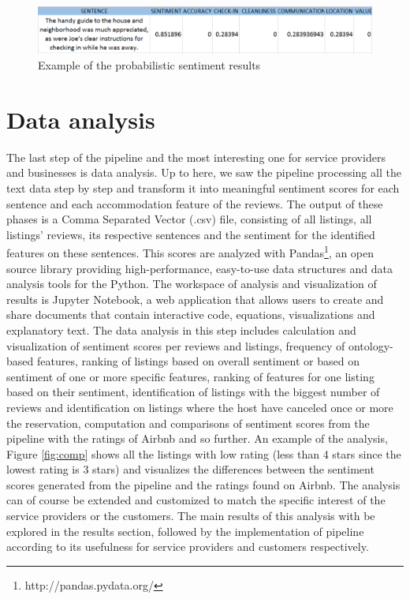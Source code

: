 \begin{figure}[h!]
	\centering
	\includegraphics[height=0.1\textheight]{example_pip}
	\caption{Example of the probabilistic sentiment results}
	\label{fig:sent}
\end{figure}

%

\section{Data analysis}
% 
%
The last step of the pipeline and the most interesting one for service providers and businesses is data analysis. Up to here, we saw the pipeline processing all the text data step by step and transform it into meaningful sentiment scores for each sentence and each accommodation feature of the reviews. The output of these phases is a Comma Separated Vector (.csv) file, consisting of all listings, all listings' reviews, its respective sentences and the sentiment for the identified features on these sentences. This scores are analyzed with Pandas\footnote{http://pandas.pydata.org/}, an open source library providing high-performance, easy-to-use data structures and data analysis tools for the Python. The workspace  of analysis and visualization of results is Jupyter Notebook, a web application that allows users to create and share documents that contain  interactive code, equations, visualizations and explanatory text. The data  analysis in this step includes calculation and visualization of sentiment scores per reviews and listings, frequency of ontology-based features, ranking of listings based on overall sentiment or based on sentiment of one or more specific features, ranking of features for one listing based on their sentiment, identification of listings with the biggest number of reviews and identification on listings where the host have canceled once or more the reservation, computation and comparisons of sentiment scores from the pipeline with the ratings of Airbnb and so further. An example of the analysis, Figure \ref{fig:comp} shows all the listings with low rating (less than 4 stars since the lowest rating is 3 stars) and visualizes the differences between the sentiment scores generated from the pipeline and the ratings found on Airbnb.  The analysis can of course be extended and customized to match the specific interest of the service providers or the customers. The main results of this analysis with be explored in the results section, followed by the implementation of pipeline according to its usefulness for service providers and customers respectively. 
